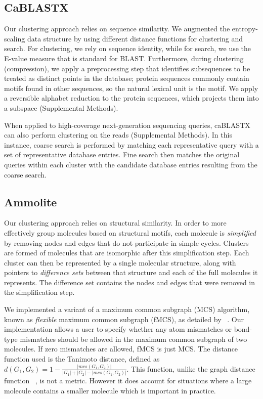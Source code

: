 \documentclass[review,preprint,12pt]{elsarticle}
\renewcommand{\cite}{\citep} %
\theoremstyle{definition}
\theoremstyle{remark}
\numberwithin{equation}{section}
\begin{document}
\subsection{CaBLASTX}
Our clustering approach relies on sequence similarity.
We augmented the entropy-scaling data structure by using
different distance functions for clustering and search.
For clustering, we rely on sequence identity, while for search, we use the
E-value measure that is standard for BLAST.
Furthermore, during clustering (compression), we apply a preprocessing step that
identifies subsequences to be treated as distinct points in the database;
protein sequences commonly contain motifs found in other sequences,
so the natural lexical unit is the motif.
We apply a reversible alphabet reduction to the
protein sequences, which projects them into a subspace (Supplemental Methods).

When applied to high-coverage next-generation sequencing queries, caBLASTX can also perform clustering on the reads (Supplemental Methods).
In this instance, coarse search is performed by matching each representative query with a set of representative database entries.
Fine search then matches the original queries within each cluster with the candidate database entries resulting from the coarse search.

\subsection{Ammolite}
Our clustering approach relies on structural similarity.
In order to more effectively group molecules based on structural motifs,
each molecule is \emph{simplified} by removing nodes and edges that do not
participate in simple cycles.
Clusters are formed of molecules that are isomorphic after this simplification
step.
Each cluster can then be represented by a single molecular structure, along 
with pointers to \emph{difference sets} between that structure and each of the 
full molecules it represents.
The difference set contains the nodes and edges that were removed in the 
simplification step.

We implemented a variant of a maximum common subgraph (MCS) algorithm, known as 
\emph{flexible} maximum
common subgraph (fMCS), as detailed by ~\citet{cao2008maximum}.
Our implementation allows a user to specify whether any atom mismatches or 
bond-type mismatches should be 
allowed in the maximum common subgraph of two molecules.
If zero mismatches are allowed, fMCS is just MCS.
The distance function used is the Tanimoto distance, defined as 
$d(G_1,G_2) = 1 - \frac{ |mcs(G_1,G_2)| }{|G_1|+|G_2|-|mcs(G_1,G_2)|}$. 
This function, unlike 
the graph distance function  ~\cite{bunke1998graph}, is not a metric. However it does account for
situations where a large molecule contains a smaller molecule which is important in practice.
\end{document}
